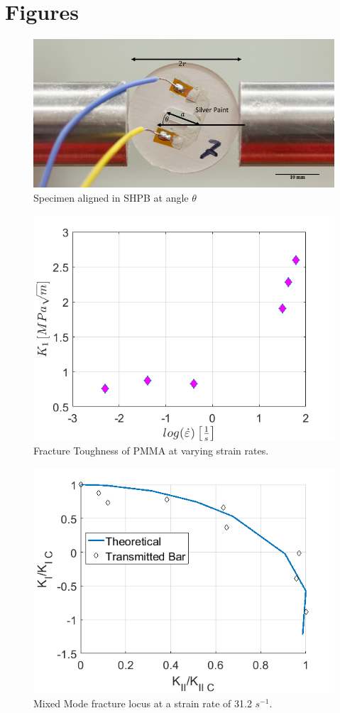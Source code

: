 \documentclass[12pt]{article}
\begin{document}
\section{Figures} %

\begin{figure}[H]
	\centering
	\includegraphics[width=.8\textwidth,scale=1]{LastImg.png}
	\caption{Specimen aligned in SHPB at angle $\theta$}
	\label{fig:Spec}
\end{figure}

\begin{figure}[H]
	\centering
	\includegraphics[width=.67\textwidth,scale=1]{Goal1.png}
	\caption{Fracture Toughness of PMMA at varying strain rates.}
	\label{fig:Goal1}
\end{figure}

\begin{figure}[H]
	\centering
	\includegraphics[width=.67\textwidth,scale=1]{Goal2.png}
	\caption{Mixed Mode fracture locus at a strain rate of 31.2 $s^{-1}$.}
	\label{fig:Goal2}
\end{figure}
\end{document}

